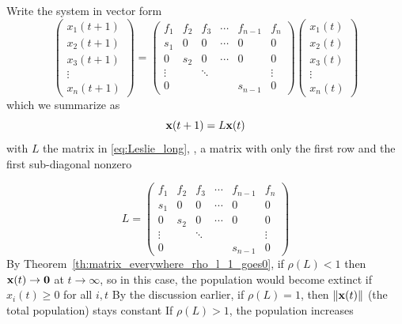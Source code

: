 \documentclass[aspectratio=169]{beamer}
\begin{document}
\begin{frame}
Write the system in vector form
\begin{equation}\label{eq:Leslie_long}
\begin{pmatrix}
x_1(t+1) \\ x_2(t+1) \\ x_3(t+1) \\ \vdots \\ x_n(t+1)
\end{pmatrix}
=
\begin{pmatrix}
f_1 & f_2 & f_3 & \cdots & f_{n-1} & f_n \\
s_1 & 0 & 0 & \cdots & 0 & 0 \\
0 & s_2 & 0 & \cdots & 0 & 0 \\
\vdots && \ddots &&& \vdots \\
0 &&&&s_{n-1} & 0
\end{pmatrix}
\begin{pmatrix}
x_1(t) \\ x_2(t) \\ x_3(t) \\ \vdots \\ x_n(t)
\end{pmatrix}
\end{equation}
which we summarize as
\begin{equation}\label{eq:Leslie_short}
\mathbf{x}(t+1)=L\mathbf{x}(t)
\end{equation}
with $L$ the matrix in \eqref{eq:Leslie_long}, \ie, a  matrix with only the first row and the first sub-diagonal nonzero
\end{frame}


\begin{frame}
\[
L= \begin{pmatrix}
f_1 & f_2 & f_3 & \cdots & f_{n-1} & f_n \\
s_1 & 0 & 0 & \cdots & 0 & 0 \\
0 & s_2 & 0 & \cdots & 0 & 0 \\
\vdots && \ddots &&& \vdots \\
0 &&&&s_{n-1} & 0
\end{pmatrix}
\]
\vfill
By Theorem~\ref{th:matrix_everywhere_rho_l_1_goes0}, if $\rho(L)<1$ then $\bx(t)\to \b0$ at $t\to\infty$, so in this case, the population would become extinct if $x_i(t)\geq 0$ for all $i,t$
\vfill
By the discussion earlier, if $\rho(L)=1$, then $\|\mathbf{x}(t)\|$ (the total population) stays constant
\vfill
If $\rho(L)>1$, the population increases
\end{frame}
\end{document}

